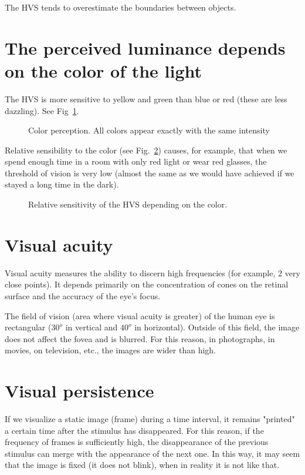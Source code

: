 The HVS tends to overestimate the boundaries between objects.

\section{The perceived luminance depends on the color of the light}
The HVS is more sensitive to yellow and green than blue or red (these are less dazzling). See Fig~\ref{fig:color_perception}.

\begin{figure}
  \caption{Color perception. All colors appear exactly with the same intensity} %
  \label{fig:color_perception}
\end{figure}

Relative sensibility to the color (see Fig.~\ref{fig:color_relative_sensibility}) causes, for example, that when we spend enough time in a room with only red light or wear red glasses, the threshold of vision is very low (almost the same as we would have achieved if we stayed a long time in the dark).

\begin{figure}
  \caption{Relative sensitivity of the HVS depending on the color.} %
  \label{fig:color_relative_sensibility}
\end{figure}

\section{Visual acuity}

Visual acuity measures the ability to discern high frequencies (for example, 2 very close points). It depends primarily on the concentration of cones on the retinal surface and the accuracy of the eye's focus.

The field of vision (area where visual acuity is greater) of the human eye is rectangular ($30^o$ in vertical and $40^o$ in horizontal). Outside of this field, the image does not affect the fovea and is blurred. For this reason, in photographs, in movies, on television, etc., the images are wider than high.

\section{Visual persistence}

If we visualize a static image (frame) during a time interval, it remains "printed" a certain time after the stimulus has disappeared. For this reason, if the frequency of frames is sufficiently high, the disappearance of the previous stimulus can merge with the appearance of the next one. In this way, it may seem that the image is fixed (it does not blink), when in reality it is not like that.

